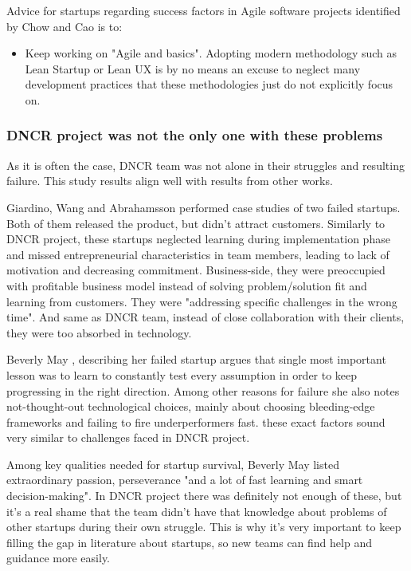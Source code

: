 \documentclass{article}
\begin{document}
Advice for startups regarding success factors in Agile software projects identified by Chow and Cao is to:
\begin{itemize}
\item Keep working on "Agile and basics". Adopting modern methodology such as Lean Startup or Lean UX is by no means an excuse to neglect many development practices that these methodologies just do not explicitly focus on.
\end{itemize}

\subsubsection{DNCR project was not the only one with these problems}
As it is often the case, DNCR team was not alone in their struggles and resulting failure. This study results align well with results from other works.

Giardino, Wang and Abrahamsson \cite{giardino2014early} performed case studies of two failed startups. Both of them released the product, but didn't attract customers. Similarly to DNCR project, these startups neglected learning during implementation phase and missed entrepreneurial characteristics in team members, leading to lack of motivation and decreasing commitment. Business-side, they were preoccupied with profitable business model instead of solving problem/solution fit and learning from customers. They were "addressing specific challenges in the wrong time". And same as DNCR team, instead of close collaboration with their clients, they were too absorbed in technology.

Beverly May \cite{may2012applying}, describing her failed startup argues that single most important lesson was to learn to constantly test every assumption in order to keep progressing in the right direction. Among other reasons for failure she also notes not-thought-out technological choices, mainly about choosing bleeding-edge frameworks and failing to fire underperformers fast. these exact factors sound very similar to challenges faced in DNCR project.

Among key qualities needed for startup survival, Beverly May listed extraordinary passion, perseverance "and a lot of fast learning and smart decision-making". In DNCR project there was definitely not enough of these, but it's a real shame that the team didn't have that knowledge about problems of other startups during their own struggle. This is why it's very important to keep filling the gap in literature about startups, so new teams can find help and guidance more easily.
\end{document}
